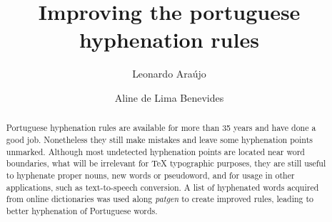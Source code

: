 \documentclass{article}
\title{Improving the portuguese hyphenation rules}
\author{Leonardo Araújo \and Aline de Lima Benevides}
\begin{document}
\maketitle







\begin{abstract}
    Portuguese hyphenation rules are available for more than 35
    years and have done a good job. Nonetheless they still make mistakes and
    leave some hyphenation points unmarked. Although most undetected
    hyphenation points are located near word boundaries, what will be
    irrelevant for \TeX{} typographic purposes, they are still useful to
    hyphenate proper nouns, new words or pseudoword, and for usage in other
    applications, such as text-to-speech conversion. A list of
    \DictionarySize{} hyphenated words acquired from online dictionaries was
    used along \emph{patgen} to create improved rules, leading to better hyphenation
    of Portuguese words.
\end{abstract}
\end{document}
